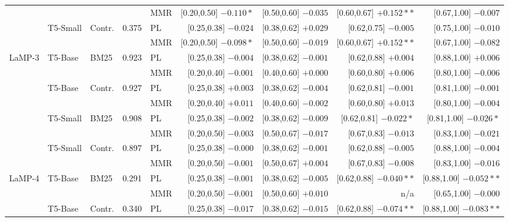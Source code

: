 \documentclass[10pt]{article}
\begin{document}
\begin{table}[p]
\begin{tabular}{@{}lllrlrrrr@{}}
 &  &  &  & MMR & [0.20,0.50] $-0.110*$ & [0.50,0.60] $-0.035$ & [0.60,0.67] $+0.152**$ & [0.67,1.00] $-0.007$ \\
\cmidrule(lr){1-9}
 & \multirow{2}{*}{T5-Small} & \multirow{2}{*}{Contr.} & \multirow{2}{*}{0.375} & PL & [0.25,0.38] $-0.024$ & [0.38,0.62] $+0.029$ & [0.62,0.75] $-0.005$ & [0.75,1.00] $-0.010$ \\
 &  &  &  & MMR & [0.20,0.50] $-0.098*$ & [0.50,0.60] $-0.019$ & [0.60,0.67] $+0.152**$ & [0.67,1.00] $-0.082$ \\
\midrule
\multirow{2}{*}{LaMP-3} & \multirow{2}{*}{T5-Base} & \multirow{2}{*}{BM25} & \multirow{2}{*}{0.923} & PL & [0.25,0.38] $-0.004$ & [0.38,0.62] $-0.001$ & [0.62,0.88] $+0.004$ & [0.88,1.00] $+0.006$ \\
 &  &  &  & MMR & [0.20,0.40] $-0.001$ & [0.40,0.60] $+0.000$ & [0.60,0.80] $+0.006$ & [0.80,1.00] $-0.006$ \\
\cmidrule(lr){1-9}
 & \multirow{2}{*}{T5-Base} & \multirow{2}{*}{Contr.} & \multirow{2}{*}{0.927} & PL & [0.25,0.38] $+0.003$ & [0.38,0.62] $-0.004$ & [0.62,0.81] $-0.001$ & [0.81,1.00] $-0.001$ \\
 &  &  &  & MMR & [0.20,0.40] $+0.011$ & [0.40,0.60] $-0.002$ & [0.60,0.80] $+0.013$ & [0.80,1.00] $-0.004$ \\
\cmidrule(lr){1-9}
 & \multirow{2}{*}{T5-Small} & \multirow{2}{*}{BM25} & \multirow{2}{*}{0.908} & PL & [0.25,0.38] $-0.002$ & [0.38,0.62] $-0.009$ & [0.62,0.81] $-0.022*$ & [0.81,1.00] $-0.026*$ \\
 &  &  &  & MMR & [0.20,0.50] $-0.003$ & [0.50,0.67] $-0.017$ & [0.67,0.83] $-0.013$ & [0.83,1.00] $-0.021$ \\
\cmidrule(lr){1-9}
 & \multirow{2}{*}{T5-Small} & \multirow{2}{*}{Contr.} & \multirow{2}{*}{0.897} & PL & [0.25,0.38] $-0.000$ & [0.38,0.62] $-0.001$ & [0.62,0.88] $-0.005$ & [0.88,1.00] $-0.004$ \\
 &  &  &  & MMR & [0.20,0.50] $-0.001$ & [0.50,0.67] $+0.004$ & [0.67,0.83] $-0.008$ & [0.83,1.00] $-0.016$ \\
\midrule
\multirow{2}{*}{LaMP-4} & \multirow{2}{*}{T5-Base} & \multirow{2}{*}{BM25} & \multirow{2}{*}{0.291} & PL & [0.25,0.38] $-0.001$ & [0.38,0.62] $-0.005$ & [0.62,0.88] $-0.040**$ & [0.88,1.00] $-0.052**$ \\
 &  &  &  & MMR & [0.20,0.50] $-0.001$ & [0.50,0.60] $+0.010$ & n/a & [0.65,1.00] $-0.000$ \\
\cmidrule(lr){1-9}
 & \multirow{2}{*}{T5-Base} & \multirow{2}{*}{Contr.} & \multirow{2}{*}{0.340} & PL & [0.25,0.38] $-0.017$ & [0.38,0.62] $-0.015$ & [0.62,0.88] $-0.074**$ & [0.88,1.00] $-0.083**$ \\

\end{tabular}
\end{table}
\end{document}
